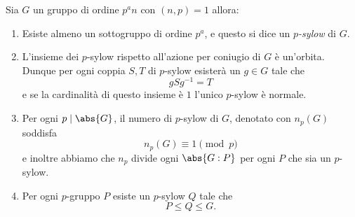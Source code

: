 \documentclass[11pt]{scrartcl}
\begin{document}
	 \begin{theorem}
	 	Sia $G$ un gruppo di ordine $p^an$ con $(n,p)=1$ allora:
	 	\begin{enumerate}
	 		\item Esiste almeno un sottogruppo di ordine $p^a$, e questo si dice un \textit{$p$-sylow} di $G$. 
	 		\item L'insieme dei $p$-sylow rispetto all'azione per coniugio di $G$ è un'orbita. Dunque per ogni coppia $S,T$ di $p$-sylow esisterà un $g\in G$ tale che
	 		$$gSg^{-1}=T$$
	 		e se la cardinalità di questo insieme è $1$ l'unico $p$-sylow è normale.
	 		\item Per ogni $p\mid \abs{G}$, il numero di $p$-sylow di $G$, denotato con $n_p(G)$ soddisfa
	 		$$n_p(G)\equiv 1 \pmod{p}$$
	 		e inoltre abbiamo che $n_p$ divide ogni  $\abs{G:P}$ per ogni $P$ che sia un $p$-sylow.
	 		\item Per ogni $p$-gruppo $P$ esiste un $p$-sylow $Q$ tale che
	 		$$P\le Q \le G.$$
	 	\end{enumerate}
	 \end{theorem}
\end{document}

